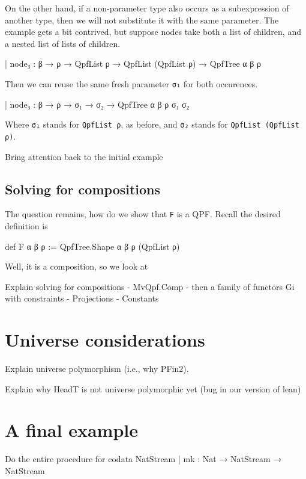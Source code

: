 \documentclass[titlepage]{report}
\newenvironment{todo}{\begin{shaded}\begin{trivlist}                         
    \item[\hskip \labelsep {\bfseries Todo:}]}{\end{trivlist}\end{shaded}}
\begin{document}
On the other hand, if a non-parameter type also occurs as a subexpression of another type, then
we will not substitute it with the same parameter.
The example gets a bit contrived, but suppose nodes take both a list of children, and a nested list 
of lists of children.
\begin{leancode}
    | node₃ : β → ρ → QpfList ρ → QpfList (QpfList ρ) → QpfTree α β ρ
\end{leancode}
Then we can reuse the same fresh parameter \texttt{σ₁} for both occurences.
\begin{leancode}
    | node₃ : β → ρ → σ₁ → σ₂ → QpfTree α β ρ σ₁ σ₂
\end{leancode}
Where \texttt{σ₁} stands for \texttt{QpfList ρ}, as before, and \texttt{σ₂} stands for 
\texttt{QpfList (QpfList ρ)}.

\begin{todo}
    Bring attention back to the initial example
\end{todo}


\subsection{Solving for compositions}

The question remains, how do we show that \texttt{F} is a QPF.
Recall the desired definition is
\begin{leancode}
    def F α β ρ := QpfTree.Shape α β ρ (QpfList ρ)
\end{leancode}

Well, it is a composition, so we look at 

\begin{todo}
    Explain solving for compositions
    - MvQpf.Comp
    - then a family of functors Gi with constraints
    - Projections
    - Constants
\end{todo}




\section{Universe considerations}
\begin{todo}
    Explain universe polymorphism (i.e., why PFin2).

    Explain why HeadT is not universe polymorphic yet (bug in our version of lean)
\end{todo}


\section{A final example}
\begin{todo}
    Do the entire procedure for
    codata NatStream
    | mk : Nat → NatStream → NatStream
\end{todo}
\end{document}

